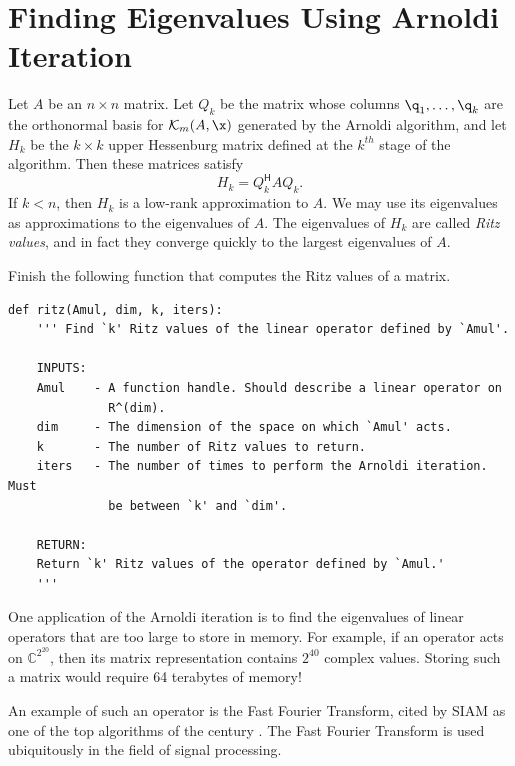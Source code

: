 \section*{Finding Eigenvalues Using Arnoldi Iteration} %

Let $A$ be an $n \times n$ matrix.
Let $Q_k$ be the matrix whose columns $\q_1, \ldots, \q_k$ are the orthonormal basis for $\mathcal{K}_m(A, \x)$ generated by the Arnoldi algorithm, and
let $H_k$ be the $k\times k$ upper Hessenburg matrix defined at the $k^{th}$ stage of the algorithm.
Then these matrices satisfy
\begin{equation}\label{equ:hqa}
H_k = Q_k^{\mathsf H} A Q_k.
\end{equation}
If $k<n$, then $H_k$ is a low-rank approximation to $A$.
We may use its eigenvalues as approximations to the eigenvalues of $A$.
The eigenvalues of $H_k$ are called \emph{Ritz values}, and in fact they converge quickly to the largest eigenvalues of $A$.

\begin{problem}\label{prob:ritz}
Finish the following function that computes the Ritz values of a matrix.

\begin{lstlisting}
def ritz(Amul, dim, k, iters):
    ''' Find `k' Ritz values of the linear operator defined by `Amul'.

    INPUTS:
    Amul    - A function handle. Should describe a linear operator on
              R^(dim).
    dim     - The dimension of the space on which `Amul' acts.
    k 	    - The number of Ritz values to return.
    iters   - The number of times to perform the Arnoldi iteration. Must
              be between `k' and `dim'.

    RETURN:
    Return `k' Ritz values of the operator defined by `Amul.'
    '''
\end{lstlisting}
\end{problem}

One application of the Arnoldi iteration is to find the eigenvalues of linear operators that are too large to store in memory.
For example, if an operator acts on $\mathbb{C}^{2^{20}}$, then its matrix representation contains $2^{40}$ complex values.
Storing such a matrix would require 64 terabytes of memory!

An example of such an operator is the Fast Fourier Transform, cited by SIAM as one of the top algorithms of the century \cite{Cipra2000}.
The Fast Fourier Transform is used ubiquitously in the field of signal processing.

